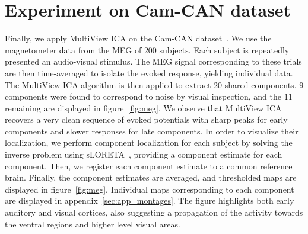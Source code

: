 \section{Experiment on Cam-CAN dataset}
Finally, we apply MultiView ICA on the Cam-CAN dataset~\cite{taylor2017cambridge}. We use the magnetometer data from the MEG of $200$ subjects.
%
Each subject is repeatedly presented an audio-visual stimulus. 
%
The MEG signal corresponding to these trials are then time-averaged to isolate the evoked response, yielding individual data.
%
The MultiView ICA algorithm is then applied to extract $20$ shared components.
%
$9$ components were found to correspond to noise by visual inspection, and the $11$ remaining are displayed in figure~\ref{fig:meg}.
%
We observe that MultiView ICA recovers a very clean sequence of evoked potentials with sharp peaks
for early components and slower responses for late components.
%
In order to visualize their localization, we perform component localization for each subject by solving the inverse problem using sLORETA~\cite{pascual2002standardized}, providing a component estimate for each component.
%
Then, we register each component estimate to a common reference brain.
%
Finally, the component estimates are averaged, and thresholded maps are displayed in figure~\ref{fig:meg}.
%
Individual maps corresponding to each component are displayed in appendix~\ref{sec:app_montages}.
The figure highlights both early auditory and visual cortices, also suggesting a propagation
of the activity towards the ventral regions and higher level visual areas.

